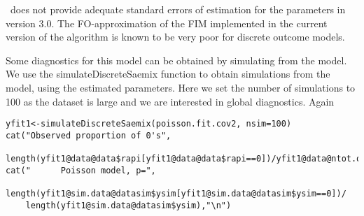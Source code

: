  \monolix~does not provide adequate standard errors of estimation for the parameters in version 3.0. The FO-approximation of the FIM implemented in the current version of the algorithm is known to be very poor for discrete outcome models.

Some diagnostics for this model can be obtained by simulating from the model. We use the {\sf simulateDiscreteSaemix} function to obtain simulations from the model, using the estimated parameters. Here we set the number of simulations to 100 as the dataset is large and we are interested in global diagnostics. Again 
\begin{verbatim}
yfit1<-simulateDiscreteSaemix(poisson.fit.cov2, nsim=100)
cat("Observed proportion of 0's", 
     length(yfit1@data@data$rapi[yfit1@data@data$rapi==0])/yfit1@data@ntot.obs,"\n")
cat("      Poisson model, p=",
    length(yfit1@sim.data@datasim$ysim[yfit1@sim.data@datasim$ysim==0])/
    length(yfit1@sim.data@datasim$ysim),"\n") 
\end{verbatim}

